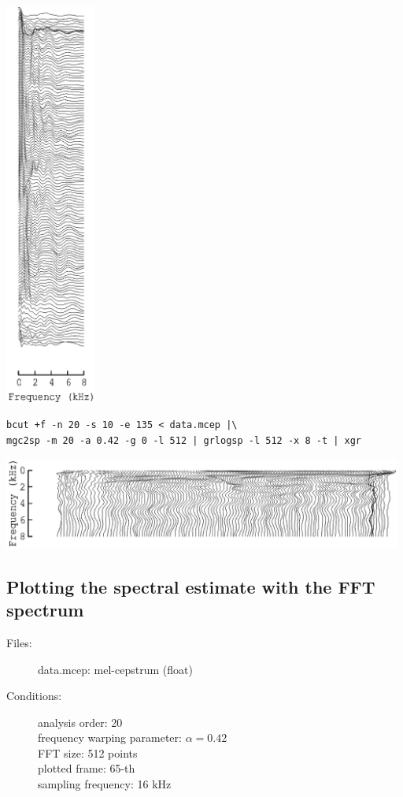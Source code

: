\documentclass[a4paper,10pt]{article}
\begin{document}
\includegraphics[width=3cm]{eps/data.mcep.grlogsp.eps}

\begin{verbatim}
bcut +f -n 20 -s 10 -e 135 < data.mcep |\
mgc2sp -m 20 -a 0.42 -g 0 -l 512 | grlogsp -l 512 -x 8 -t | xgr
\end{verbatim}

\includegraphics[height=3cm]{eps/data.mcep.grlogsp-t.eps}

\subsection{Plotting the spectral estimate with the FFT spectrum}

\begin{description}
\item[Files:]
  data.mcep: mel-cepstrum (float)
\item[Conditions:]
  analysis order: 20\\
  frequency warping parameter: $\alpha = 0.42$\\
  FFT size: 512 points\\
  plotted frame: 65-th\\
  sampling frequency: 16 kHz
\end{description}
\end{document}
